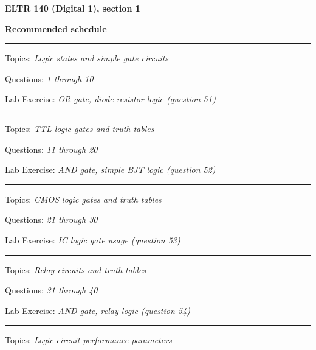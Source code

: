 
\centerline{\bf ELTR 140 (Digital 1), section 1} \bigskip 
 
\vskip 10pt

\noindent
{\bf Recommended schedule}

\vskip 5pt

\hrule \vskip 5pt
\noindent
{}

\hskip 10pt Topics: {\it Logic states and simple gate circuits}
 
\hskip 10pt Questions: {\it 1 through 10}
 
\hskip 10pt Lab Exercise: {\it OR gate, diode-resistor logic (question 51)}
 



\vskip 10pt
\hrule \vskip 5pt
\noindent
{}

\hskip 10pt Topics: {\it TTL logic gates and truth tables}
 
\hskip 10pt Questions: {\it 11 through 20}
 
\hskip 10pt Lab Exercise: {\it AND gate, simple BJT logic (question 52)}
 
\vskip 10pt
\hrule \vskip 5pt
\noindent
{}

\hskip 10pt Topics: {\it CMOS logic gates and truth tables}
 
\hskip 10pt Questions: {\it 21 through 30}
 
\hskip 10pt Lab Exercise: {\it IC logic gate usage (question 53)}
 
\vskip 10pt
\hrule \vskip 5pt
\noindent
{}

\hskip 10pt Topics: {\it Relay circuits and truth tables}
 
\hskip 10pt Questions: {\it 31 through 40}
 
\hskip 10pt Lab Exercise: {\it AND gate, relay logic (question 54)}
 

\vskip 10pt
\hrule \vskip 5pt
\noindent
{}

\hskip 10pt Topics: {\it Logic circuit performance parameters}
 
